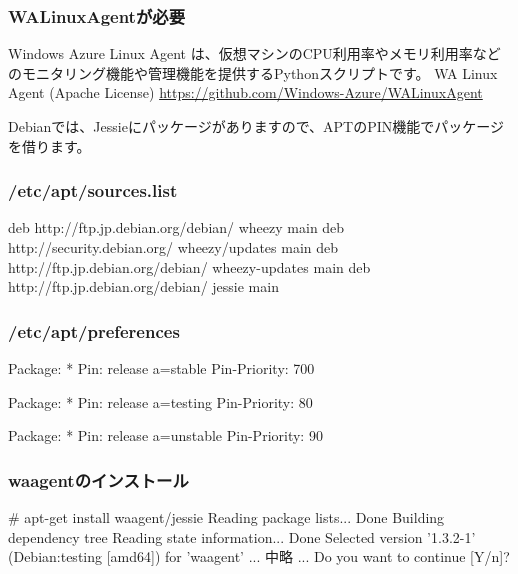 \documentclass[mingoth,a4paper,twoside]{jsarticle}
\begin{document}

\subsubsection{WALinuxAgentが必要}

Windows Azure Linux Agent は、仮想マシンのCPU利用率やメモリ利用率などのモニタリング機能や管理機能を提供するPythonスクリプトです。
WA Linux Agent (Apache License) \url{https://github.com/Windows-Azure/WALinuxAgent}

Debianでは、Jessieにパッケージがありますので、APTのPIN機能でパッケージを借ります。

\subsubsection{/etc/apt/sources.list}
\begin{commandline}
deb http://ftp.jp.debian.org/debian/ wheezy main
deb http://security.debian.org/ wheezy/updates main
deb http://ftp.jp.debian.org/debian/ wheezy-updates main
deb http://ftp.jp.debian.org/debian/ jessie main
\end{commandline}

\subsubsection{/etc/apt/preferences}
\begin{commandline}
Package: *
Pin: release a=stable
Pin-Priority: 700

Package: *
Pin: release a=testing
Pin-Priority: 80

Package: *
Pin: release a=unstable
Pin-Priority: 90
\end{commandline}

\subsubsection{waagentのインストール}
\begin{commandline}
# apt-get install waagent/jessie
Reading package lists... Done
Building dependency tree
Reading state information... Done
Selected version '1.3.2-1' (Debian:testing [amd64]) for 'waagent'
... 中略 ...
Do you want to continue [Y/n]?
\end{commandline}
\end{document}
